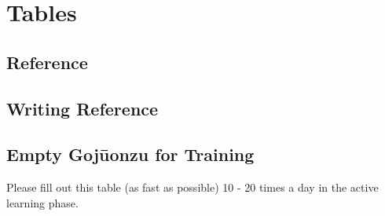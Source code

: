\newcommand{\jTableKana}[2]{\jptab/#1#2}

\chapter{\jscript{} Tables}\label{chap:KanaTables}

\section{\jscript{} Reference}

\section{\jscript{} Writing Reference}



\newpage

\section{Empty Gojūonzu for Training}
\label{app:Leere50LauteTafel} Please fill out this table (as fast as possible)
10 - 20 times a day in the active learning phase.


